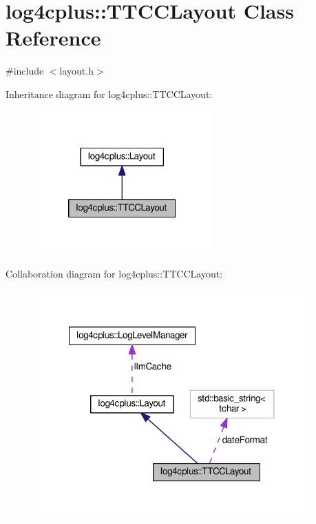 \hypertarget{classlog4cplus_1_1TTCCLayout}{\section{log4cplus\-:\-:T\-T\-C\-C\-Layout Class Reference}
\label{classlog4cplus_1_1TTCCLayout}
}


{\ttfamily \#include $<$layout.\-h$>$}



Inheritance diagram for log4cplus\-:\-:T\-T\-C\-C\-Layout\-:
\nopagebreak
\begin{figure}[H]
\begin{center}
\leavevmode
\includegraphics[width=194pt]{classlog4cplus_1_1TTCCLayout__inherit__graph}
\end{center}
\end{figure}


Collaboration diagram for log4cplus\-:\-:T\-T\-C\-C\-Layout\-:
\nopagebreak
\begin{figure}[H]
\begin{center}
\leavevmode
\includegraphics[width=302pt]{classlog4cplus_1_1TTCCLayout__coll__graph}
\end{center}
\end{figure}
